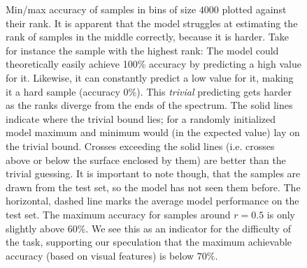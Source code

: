 \begin{figure}
    \caption[Min/max accuracy against rank]{Min/max accuracy of samples in bins of size $4000$ plotted against their rank. It is apparent that the model struggles at estimating the rank of samples in the middle correctly, because it is harder. Take for instance the sample with the highest rank: The model could theoretically easily achieve 100\% accuracy by predicting a high value for it. Likewise, it can constantly predict a low value for it, making it a hard sample (accuracy 0\%). This \textit{trivial} predicting gets harder as the ranks diverge from the ends of the spectrum. The solid lines indicate where the trivial bound lies; for a randomly initialized model maximum and minimum would (in the expected value) lay on the trivial bound. Crosses exceeding the solid lines (i.e. crosses above or below the surface enclosed by them) are better than the trivial guessing. It is important to note though, that the samples are drawn from the test set, so the model has not seen them before. The horizontal, dashed line marks the average model performance on the test set. The maximum accuracy for samples around $r=0.5$ is only slightly above $60\%$. We see this as an indicator for the difficulty of the task, supporting our speculation that the maximum achievable accuracy (based on visual features) is below $70\%$.}
    \label{fig:minmaxaccvsrank}
\end{figure}
